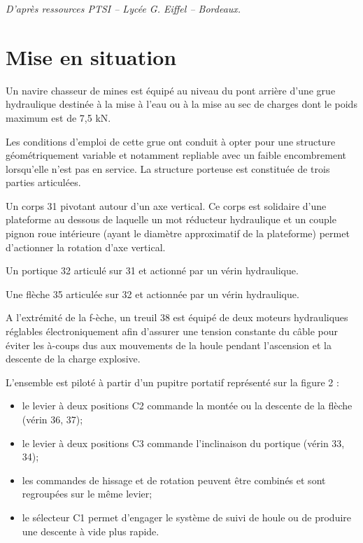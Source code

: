\documentclass[10pt]{article}
\newif\ifxp
\begin{document}
\ifxp

\else

\fi


\begin{flushright}
\textit{D'après ressources PTSI -- Lycée G. Eiffel -- Bordeaux.}
\end{flushright}
\setlength{\parskip}{0ex plus 0.2ex minus 0ex}
 \renewcommand{\contentsname}{}
 \renewcommand{\baselinestretch}{1}




\section{Mise en situation}

Un navire chasseur de mines est équipé au niveau du pont arrière d'une grue hydraulique destinée à la mise à l'eau ou à la mise au sec de charges dont le poids maximum est de 7,5 kN.

Les conditions d'emploi de cette grue ont conduit à opter pour une structure géométriquement variable et notamment repliable avec un faible encombrement lorsqu'elle n'est pas en service. La structure porteuse est constituée de trois parties articulées. 

Un corps 31 pivotant autour d'un axe vertical. Ce corps est solidaire d'une plateforme au dessous de laquelle un mot réducteur hydraulique et un couple pignon roue intérieure (ayant le diamètre approximatif de la plateforme) permet d'actionner la rotation d'axe vertical.


Un portique 32 articulé sur 31 et actionné par un vérin hydraulique. 

Une flèche 35 articulée sur 32 et actionnée par un vérin hydraulique. 

A l'extrémité de la f-èche, un treuil 38 est équipé de deux moteurs hydrauliques réglables électroniquement afin d'assurer une tension constante du câble pour éviter les à-coups dus aux mouvements de la houle pendant l'ascension et la descente de la charge explosive. 

L'ensemble est piloté à partir d'un pupitre portatif représenté sur la figure 2 :
\begin{itemize}
\item le levier à deux positions C2 commande la montée ou la descente de la flèche (vérin 36, 37);
\item le levier à deux positions C3 commande l'inclinaison du portique (vérin 33, 34);
\item les commandes de hissage et de rotation peuvent être combinés et sont regroupées sur le même levier;
\item le sélecteur C1 permet d'engager le système de suivi de houle ou de produire une descente à vide plus rapide.
\end{itemize}
\end{document}
